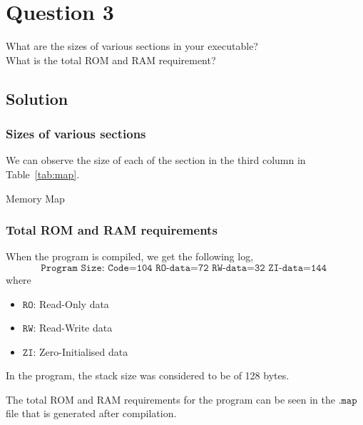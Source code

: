 \section*{Question 3}

What are the sizes of various sections in your executable?\\
What is the total ROM and RAM requirement?

\subsection*{Solution}

\subsubsection*{Sizes of various sections}

We can observe the size of each of the section in the third column in Table~\ref{tab:map}.

\begin{table}[htbp]
    \centering
    \resizebox{0.9\textwidth}{!}{
        
    }
    \caption{
        Memory Map
    }\label{tab:map}
\end{table}

\clearpage
\subsubsection*{Total ROM and RAM requirements}

When the program is compiled, we get the following log,
\[
    \texttt{
        Program Size: Code=104 RO-data=72 RW-data=32 ZI-data=144
    }
\]
where
\begin{itemize}[itemsep=0pt, topsep=0pt, partopsep=0pt, parsep=0pt]
    \item \( \texttt{RO} \): Read-Only data
    \item \( \texttt{RW} \): Read-Write data
    \item \( \texttt{ZI} \): Zero-Initialised data
\end{itemize}

\vspace*{1em}
In the program, the stack size was considered to be of 128 bytes.

The total ROM and RAM requirements for the program can be seen in the \( \texttt{.map} \) file that is generated after compilation.

\begin{table}[htbp]
    \centering
    
\end{table}

